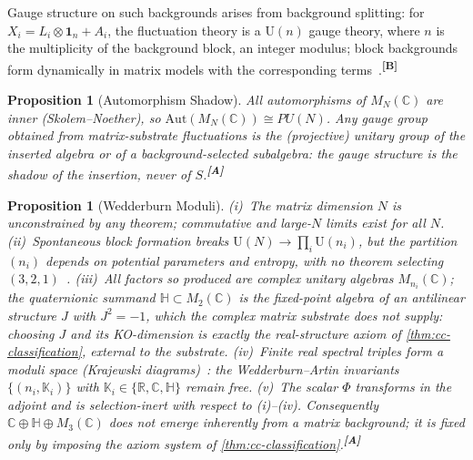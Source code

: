 \documentclass[12pt,a4paper,twoside]{article}
\theoremstyle{plain}
\newtheorem{proposition}[theorem]{Proposition}
\theoremstyle{definition}
\theoremstyle{remark}
\newcommand{\catmark}[1]{\textsuperscript{\textsf{\textbf{[#1]}}}}
\begin{document}
\noindent Gauge structure on such backgrounds arises from background
splitting: for $X_i=L_i\otimes\mathbf{1}_n+A_i$, the fluctuation theory is
a $\mathrm{U}(n)$ gauge theory, where $n$ is the multiplicity of the
background block, an integer modulus; block backgrounds form dynamically
in matrix models with the corresponding
terms~\cite{grosse2005,azuma2004,steinacker2010}.\catmark{B}

\begin{proposition}[Automorphism Shadow]
\label{prop:automorphism-shadow}
All automorphisms of $M_N(\mathbb{C})$ are inner (Skolem--Noether), so
$\mathrm{Aut}(M_N(\mathbb{C}))\cong PU(N)$. Any gauge group obtained from
matrix-substrate fluctuations is the (projective) unitary group of the
inserted algebra or of a background-selected subalgebra: the gauge
structure is the shadow of the insertion, never of $S$.\catmark{A}
\end{proposition}

\begin{proposition}[Wedderburn Moduli]
\label{prop:wedderburn-moduli}
(i)~The matrix dimension $N$ is unconstrained by any theorem; commutative
and large-$N$ limits exist for all $N$. (ii)~Spontaneous block formation
breaks $\mathrm{U}(N)\to\prod_i\mathrm{U}(n_i)$, but the partition $(n_i)$
depends on potential parameters and entropy, with no theorem selecting
$(3,2,1)$~\cite{azuma2004}. (iii)~All factors so produced are complex
unitary algebras $M_{n_i}(\mathbb{C})$; the quaternionic summand
$\mathbb{H}\subset M_2(\mathbb{C})$ is the fixed-point algebra of an
antilinear structure $J$ with $J^2=-1$, which the complex matrix substrate
does not supply: choosing $J$ and its KO-dimension is exactly the
real-structure axiom of \cref{thm:cc-classification}, external to the
substrate. (iv)~Finite real spectral triples form a moduli space
(Krajewski diagrams)~\cite{krajewski1998,paschkesitarz1998}: the
Wedderburn--Artin invariants $\{(n_i,\mathbb{K}_i)\}$ with
$\mathbb{K}_i\in\{\mathbb{R},\mathbb{C},\mathbb{H}\}$ remain free.
(v)~The scalar $\Phi$ transforms in the adjoint and is selection-inert
with respect to (i)--(iv). Consequently
$\mathbb{C}\oplus\mathbb{H}\oplus M_3(\mathbb{C})$ does not emerge
inherently from a matrix background; it is fixed only by imposing the
axiom system of \cref{thm:cc-classification}.\catmark{A}
\end{proposition}
\end{document}
